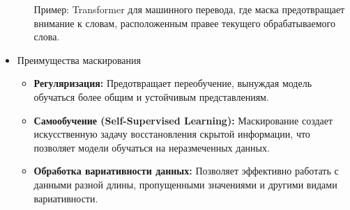 \begin{itemize}
\begin{itemize}
        Пример: Transformer для машинного перевода, где маска предотвращает внимание к словам, расположенным правее текущего обрабатываемого слова.
    \end{itemize}


    \item{Преимущества маскирования}

    \begin{itemize}
        \item \textbf{Регуляризация:} Предотвращает переобучение, вынуждая модель обучаться более общим и устойчивым представлениям.
        \item \textbf{Самообучение (Self-Supervised Learning):} Маскирование создает искусственную задачу восстановления скрытой информации, что позволяет модели обучаться на неразмеченных данных.
        \item \textbf{Обработка вариативности данных:} Позволяет эффективно работать с данными разной длины, пропущенными значениями и другими видами вариативности.
    \end{itemize}
\end{itemize}
